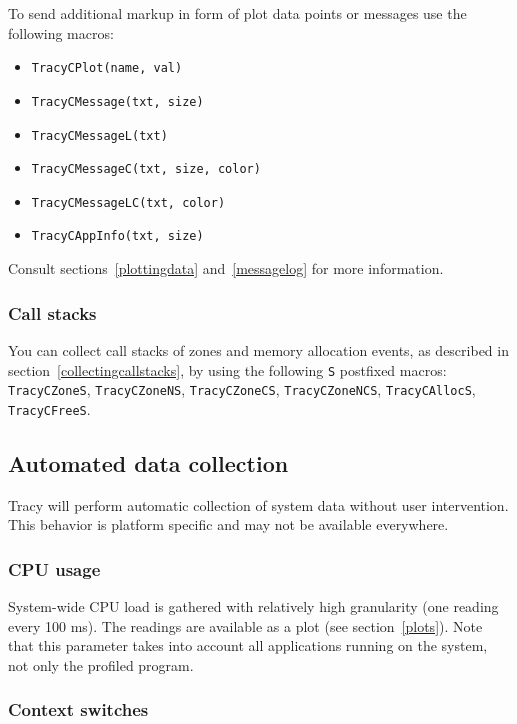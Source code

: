 \documentclass[hidelinks,titlepage,a4paper]{article}
\begin{document}
To send additional markup in form of plot data points or messages use the following macros:

\begin{itemize}
\item \texttt{TracyCPlot(name, val)}
\item \texttt{TracyCMessage(txt, size)}
\item \texttt{TracyCMessageL(txt)}
\item \texttt{TracyCMessageC(txt, size, color)}
\item \texttt{TracyCMessageLC(txt, color)}
\item \texttt{TracyCAppInfo(txt, size)}
\end{itemize}

Consult sections~\ref{plottingdata} and~\ref{messagelog} for more information.

\subsubsection{Call stacks}

You can collect call stacks of zones and memory allocation events, as described in section~\ref{collectingcallstacks}, by using the following \texttt{S} postfixed macros: \texttt{TracyCZoneS}, \texttt{TracyCZoneNS}, \texttt{TracyCZoneCS}, \texttt{TracyCZoneNCS}, \texttt{TracyCAllocS}, \texttt{TracyCFreeS}.

\subsection{Automated data collection}
\label{automated}

Tracy will perform automatic collection of system data without user intervention. This behavior is platform specific and may not be available everywhere.

\subsubsection{CPU usage}

System-wide CPU load is gathered with relatively high granularity (one reading every 100 \si{\milli\second}). The readings are available as a plot (see section~\ref{plots}). Note that this parameter takes into account all applications running on the system, not only the profiled program.

\subsubsection{Context switches}
\label{contextswitches}
\end{document}

